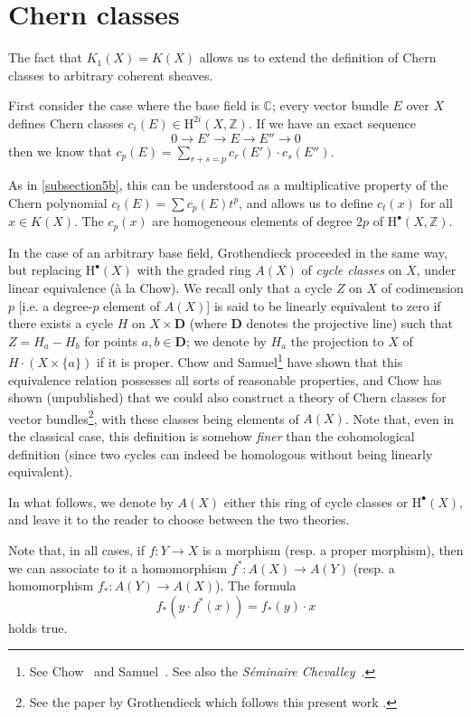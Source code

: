 \documentclass{article}
\theoremstyle{plain}
\theoremstyle{definition}
\newcommand{\HH}{\mathrm{H}}
\newcommand{\oldpage}[1]{\marginpar{\footnotesize$\Big\vert$ \textit{p.~#1}}}
\begin{document}
\section{Chern classes}
\label{section6}

The fact that $K_1(X)=K(X)$ allows us to extend the definition of Chern classes to arbitrary coherent sheaves.

First consider the case where the base field is $\mathbb{C}$;
every vector bundle $E$ over $X$ defines Chern classes $c_i(E)\in\HH^{2i}(X,\mathbb{Z})$.
If we have an exact sequence
\[
  0\to E'\to E\to E''\to0
\]
then we know that $c_p(E)=\sum_{r+s=p}c_r(E')\cdot c_s(E'')$.

As in \cref{subsection5b}, this can be understood as a multiplicative property of the Chern polynomial $c_t(E)=\sum c_p(E)t^p$, and allows us to define $c_t(x)$ for all $x\in K(X)$.
The $c_p(x)$ are homogeneous elements of degree $2p$ of $\HH^\bullet(X,\mathbb{Z})$.

In the case of an arbitrary base field, Grothendieck proceeded in the same way, but replacing $\HH^\bullet(X)$ with the graded ring $A(X)$ of \emph{cycle classes} on $X$, under linear equivalence (\`{a} la Chow).
We recall only that a cycle $Z$ on $X$ of codimension $p$ [i.e. a degree-$p$ element of $A(X)$] is said to be linearly equivalent to zero if there exists a cycle $H$ on $X\times\mathbf{D}$ (where $\mathbf{D}$ denotes the projective line) such that $Z=H_a-H_b$ for points $a,b\in\mathbf{D}$;
we denote by $H_a$ the projection to $X$ of $H\cdot(X\times\{a\})$ if it is proper.
Chow and Samuel\footnote{See Chow~\cite{5} and Samuel~\cite{10}. See also the \emph{S\'{e}minaire Chevalley}~\cite{11}.} have shown that
\oldpage{112}
this equivalence relation possesses all sorts of reasonable properties, and Chow has shown (unpublished) that we could also construct a theory of Chern classes for vector bundles\footnote{See the paper by Grothendieck which follows this present work \cite{8}.}, with these classes being elements of $A(X)$.
Note that, even in the classical case, this definition is somehow \emph{finer} than the cohomological definition (since two cycles can indeed be homologous without being linearly equivalent).

In what follows, we denote by $A(X)$ either this ring of cycle classes or $\HH^\bullet(X)$, and leave it to the reader to choose between the two theories.

Note that, in all cases, if $f\colon Y\to X$ is a morphism (resp. a proper morphism), then we can associate to it a homomorphism $f^*\colon A(X)\to A(Y)$ (resp. a homomorphism $f_*\colon A(Y)\to A(X)$).
The formula
\[
  f_*(y\cdot f^*(x)) = f_*(y)\cdot x
\]
holds true.
\end{document}

